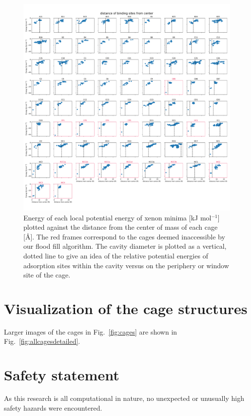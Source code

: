 \documentclass[journal=jacsat,manuscript=article]{achemso}
\begin{document}
\begin{figure}
\centering
	\includegraphics[width=\columnwidth]{../distance_of_binding_sites.pdf}
	\caption{{\color{red}Energy of each local potential energy of xenon minima [kJ mol$^{-1}$] plotted against the distance from the center of mass of each cage [\AA]. The red frames correspond to the cages deemed inaccessible by our flood fill algorithm. The cavity diameter is plotted as a vertical, dotted line to give an idea of the relative potential energies of adsorption sites within the cavity versus on the periphery or window site of the cage.}
	} \label{fig:energy_vs_dist}
\end{figure}

\clearpage

\section{Visualization of the cage structures}
Larger images of the cages in Fig.~\ref{fig:cages} are shown in Fig.~\ref{fig:allcagesdetailed}.
\captionsetup[subfigure]{labelformat=empty} %


\newpage
\clearpage

\section{Safety statement}
As this research is all computational in nature, no unexpected or unusually high safety hazards were encountered.

\clearpage


\end{document}
